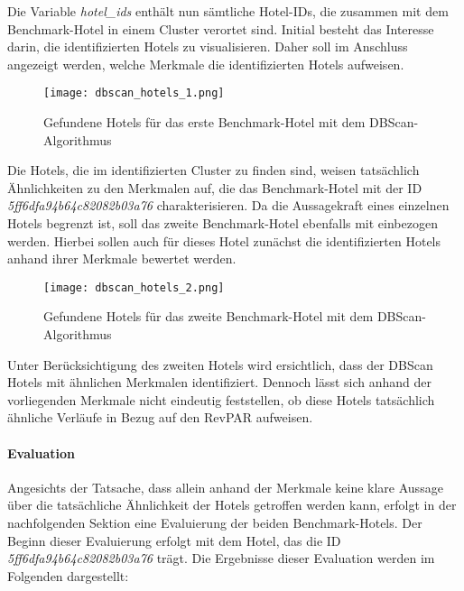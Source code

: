 Die Variable \emph{hotel\_ids} enthält nun sämtliche Hotel-IDs, die zusammen mit dem Benchmark-Hotel in einem Cluster verortet sind. Initial besteht das Interesse darin, die identifizierten Hotels zu visualisieren. Daher soll im Anschluss angezeigt werden, welche Merkmale die identifizierten Hotels aufweisen.

\begin{figure}[h]
    \centering
    \texttt{[image: dbscan\_hotels\_1.png]}
    \caption[Gefundene Hotels für das erste Benchmark-Hotel mit dem DBScan-Algorithmus]{Gefundene Hotels für das erste Benchmark-Hotel mit dem DBScan-Algorithmus}
    \label{img:dbscan_hotels_1}
\end{figure}

Die Hotels, die im identifizierten Cluster zu finden sind, weisen tatsächlich Ähnlichkeiten zu den Merkmalen auf, die das Benchmark-Hotel mit der ID \emph{5ff6dfa94b64c82082b03a76} charakterisieren. Da die Aussagekraft eines einzelnen Hotels begrenzt ist, soll das zweite Benchmark-Hotel ebenfalls mit einbezogen werden. Hierbei sollen auch für dieses Hotel zunächst die identifizierten Hotels anhand ihrer Merkmale bewertet werden.

\begin{figure}[h]
    \centering
    \texttt{[image: dbscan\_hotels\_2.png]}
    \caption[Gefundene Hotels für das zweite Benchmark-Hotel mit dem DBScan-Algorithmus]{Gefundene Hotels für das zweite Benchmark-Hotel mit dem DBScan-Algorithmus}
    \label{img:dbscan_hotels_2}
\end{figure}

Unter Berücksichtigung des zweiten Hotels wird ersichtlich, dass der DBScan Hotels mit ähnlichen Merkmalen identifiziert. Dennoch lässt sich anhand der vorliegenden Merkmale nicht eindeutig feststellen, ob diese Hotels tatsächlich ähnliche Verläufe in Bezug auf den RevPAR aufweisen.

\paragraph{Evaluation}
Angesichts der Tatsache, dass allein anhand der Merkmale keine klare Aussage über die tatsächliche Ähnlichkeit der Hotels getroffen werden kann, erfolgt in der nachfolgenden Sektion eine Evaluierung der beiden Benchmark-Hotels. 
\newline
\newline
Der Beginn dieser Evaluierung erfolgt mit dem Hotel, das die ID \emph{5ff6dfa94b64c82082b03a76} trägt. Die Ergebnisse dieser Evaluation werden im Folgenden dargestellt:

